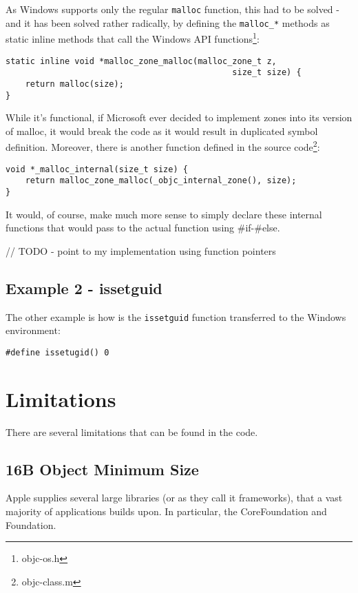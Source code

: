 As Windows supports only the regular \verb=malloc= function, this had to be solved - and it has been solved rather radically, by defining the \verb=malloc_*= methods as static inline methods that call the Windows API functions\footnote{objc-os.h}:

\begin{verbatim}
static inline void *malloc_zone_malloc(malloc_zone_t z, 
                                              size_t size) { 
    return malloc(size); 
}
\end{verbatim}

While it's functional, if Microsoft ever decided to implement zones into its version of malloc, it would break the code as it would result in duplicated symbol definition. Moreover, there is another function defined in the source code\footnote{objc-class.m}:

\begin{verbatim}
void *_malloc_internal(size_t size) {
    return malloc_zone_malloc(_objc_internal_zone(), size);
}
\end{verbatim}

It would, of course, make much more sense to simply declare these internal functions that would pass to the actual function using #if-#else.

// TODO - point to my implementation using function pointers

\subsection{Example 2 - issetguid}
The other example is how is the \verb=issetguid= function transferred to the Windows environment:

\begin{verbatim}
#define issetugid() 0
\end{verbatim}

\section{Limitations}
There are several limitations that can be found in the code.

\subsection{16B Object Minimum Size}
Apple supplies several large libraries (or as they call it frameworks), that a vast majority of applications builds upon. In particular, the CoreFoundation and Foundation.

